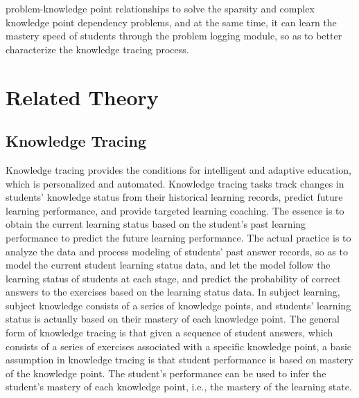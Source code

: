 problem-knowledge point relationships to solve the sparsity and complex knowledge point dependency problems, and at the same time, it can learn the mastery speed of students through the problem logging module, so as to better characterize the knowledge tracing process.

\section{Related Theory}
\subsection{Knowledge Tracing}



Knowledge tracing provides the conditions for intelligent and adaptive education, which is personalized and automated. Knowledge tracing tasks track changes in students' knowledge status from their historical learning records, predict future learning performance, and provide targeted learning coaching. The essence is to obtain the current learning status based on the student's past learning performance to predict the future learning performance. The actual practice is to analyze the data and process modeling of students' past answer records, so as to model the current student learning status data, and let the model follow the learning status of students at each stage, and predict the probability of correct answers to the exercises based on the learning status data. In subject learning, subject knowledge consists of a series of knowledge points, and students' learning status is actually based on their mastery of each knowledge point. The general form of knowledge tracing is that given a sequence of student answers, which consists of a series of exercises associated with a specific knowledge point, a basic assumption in knowledge tracing is that student performance is based on mastery of the knowledge point. The student's performance can be used to infer the student's mastery of each knowledge point, i.e., the mastery of the learning state.

